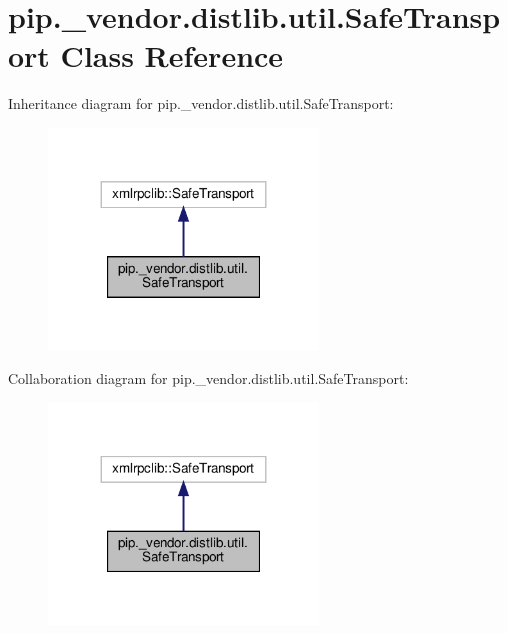 \hypertarget{classpip_1_1__vendor_1_1distlib_1_1util_1_1SafeTransport}{}\section{pip.\+\_\+vendor.\+distlib.\+util.\+Safe\+Transport Class Reference}
\label{classpip_1_1__vendor_1_1distlib_1_1util_1_1SafeTransport}


Inheritance diagram for pip.\+\_\+vendor.\+distlib.\+util.\+Safe\+Transport\+:
\nopagebreak
\begin{figure}[H]
\begin{center}
\leavevmode
\includegraphics[width=203pt]{classpip_1_1__vendor_1_1distlib_1_1util_1_1SafeTransport__inherit__graph}
\end{center}
\end{figure}


Collaboration diagram for pip.\+\_\+vendor.\+distlib.\+util.\+Safe\+Transport\+:
\nopagebreak
\begin{figure}[H]
\begin{center}
\leavevmode
\includegraphics[width=203pt]{classpip_1_1__vendor_1_1distlib_1_1util_1_1SafeTransport__coll__graph}
\end{center}
\end{figure}
